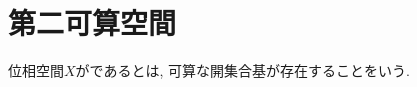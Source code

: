 \documentclass[uplatex, dvipdfmx, a4paper, 12pt, class=jsbook, crop=false]{standalone}
\begin{document}
\section{第二可算空間}
\label{sec:second-countable-spaces}

\begin{definition}
	位相空間$ X $がであるとは,
	可算な開集合基が存在することをいう.
\end{definition}
\end{document}
